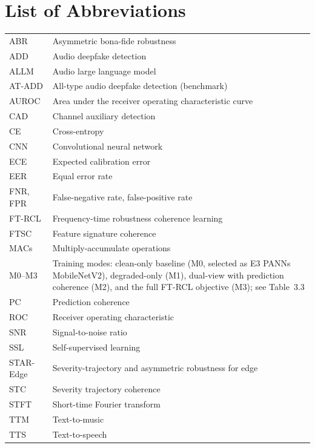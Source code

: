 \documentclass[12pt,a4paper]{report}
\begin{document}
\chapter*{List of Abbreviations}
\begingroup
\singlespacing\small
\renewcommand{\arraystretch}{1.25}
\noindent
\begin{tabular}{@{}p{}p{}@{}}
ABR      & Asymmetric bona-fide robustness \\
ADD      & Audio deepfake detection \\
ALLM     & Audio large language model \\
AT-ADD   & All-type audio deepfake detection (benchmark) \\
AUROC    & Area under the receiver operating characteristic curve \\
CAD      & Channel auxiliary detection \\
CE       & Cross-entropy \\
CNN      & Convolutional neural network \\
ECE      & Expected calibration error \\
EER      & Equal error rate \\
FNR, FPR & False-negative rate, false-positive rate \\
FT-RCL   & Frequency-time robustness coherence learning \\
FTSC     & Feature signature coherence \\
MACs     & Multiply-accumulate operations \\
M0--M3   & Training modes: clean-only baseline (M0, selected as E3 PANNs MobileNetV2), degraded-only (M1), dual-view with prediction coherence (M2), and the full FT-RCL objective (M3); see Table~3.3 \\
PC       & Prediction coherence \\
ROC      & Receiver operating characteristic \\
SNR      & Signal-to-noise ratio \\
SSL      & Self-supervised learning \\
STAR-Edge & Severity-trajectory and asymmetric robustness for edge \\
STC      & Severity trajectory coherence \\
STFT     & Short-time Fourier transform \\
TTM      & Text-to-music \\
TTS      & Text-to-speech \\
\end{tabular}
\endgroup
\end{document}
